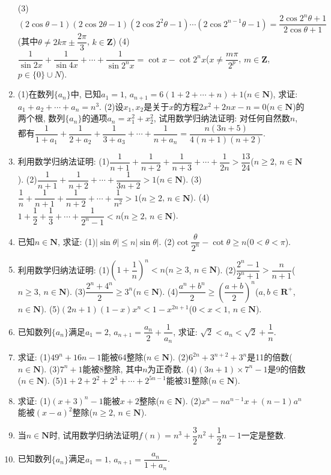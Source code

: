 \documentclass[10pt,a4paper]{article}
\begin{document}
\begin{enumerate}[1.]
(3)$(2\cos \theta -1)(2\cos 2\theta -1)(2\cos 2^2\theta -1)\cdots (2\cos 2^{n-1}\theta -1)=\dfrac{2\cos {2^n}\theta +1}{2\cos \theta +1}$(其中$\theta \ne 2k\pi \pm \dfrac{2\pi }3$, $k\in \mathbf{Z}$)
(4)$\dfrac 1{\sin 2x}+\dfrac 1{\sin 4x}+\cdots +\dfrac 1{\sin 2^nx}=\cot x-\cot 2^nx$($x\ne \dfrac{m\pi }{2^p}$, $m\in \mathbf{Z}$, $p\in \{0\}\cup N$).
\item (1)在数列$\{a_n\}$中, 已知$a_1=1$, $a_{n+1}=6(1+2+\cdots +n)+1$($n\in \mathbf{N}$), 求证: $a_1+a_2+\cdots +a_n=n^3$.
(2)设$x_1,x_2$是关于$x$的方程$2x^2+2nx-n=0$($n\in \mathbf{N}$)的两个根, 数列$\{a_n\}$的通项$a_n=x_1^2+x_2^2$, 试用数学归纳法证明: 对任何自然数$n$, 都有$\dfrac 1{1+a_1}+\dfrac 1{2+a_2}+\dfrac 1{3+a_3}+\cdots +\dfrac 1{n+a_n}=\dfrac{n(3n+5)}{4(n+1)(n+2)}$.
\item 利用数学归纳法证明:
(1)$\dfrac 1{n+1}+\dfrac 1{n+2}+\dfrac 1{n+3}+\cdots +\dfrac 1{2n}>\dfrac{13}{24}$($n\ge 2$, $n\in \mathbf{N}$).
(2)$\dfrac 1{n+1}+\dfrac 1{n+2}+\cdots +\dfrac 1{3n+2}>1$($n\in \mathbf{N}$).
(3)$\dfrac 1n+\dfrac 1{n+1}+\dfrac 1{n+2}+\cdots +\dfrac 1{n^2}>1$($n\ge 2$, $n\in \mathbf{N}$).
(4)$1+\dfrac 12+\dfrac 13+\cdots +\dfrac 1{2^n-1}<n$($n\ge 2$, $n\in \mathbf{N}$).
\item 已知$n\in \mathbf{N}$, 求证:
(1)$|\sin \theta|\le n|\sin \theta|$.
(2)$\cot \dfrac{\theta }{2^n}-\cot \theta \ge n$($0<\theta <\pi$).
\item 利用数学归纳法证明:
(1)$(1+\dfrac 1n)^n<n$($n\ge 3$, $n\in \mathbf{N}$).
(2)$\dfrac{{2^n}-1}{{2^n}+1}>\dfrac n{n+1}$($n\ge 3$, $n\in \mathbf{N}$).
(3)$\dfrac{2^n+4^n}2\ge 3^n$($n\in \mathbf{N}$).
(4)$\dfrac{a^n+b^n}2\ge (\dfrac{a+b}2)^n$($a,b\in \mathbf{R}^+$, $n\in \mathbf{N}$).
(5)$(2n+1)(1-x)x^n<1-x^{2n+1}$($0<x<1$, $n\in \mathbf{N}$).
\item 已知数列$\{a_n\}$满足$a_1=2$, $a_{n+1}=\dfrac{a_n}2+\dfrac 1{a_n}$, 求证: $\sqrt 2<a_n<\sqrt 2+\dfrac 1n$.
\item 求证:
(1)$49^n+16n-1$能被64整除($n\in \mathbf{N}$).
(2)$6^{2n}+3^{n+2}+3^n$是11的倍数($n\in \mathbf{N}$).
(3)$7^n+1$能被8整除, 其中$n$为正奇数.
(4)$(3n+1)\times 7^n-1$是9的倍数($n\in \mathbf{N}$).
(5)$1+2+2^2+2^3+\cdots +2^{5n-1}$能被31整除($n\in \mathbf{N}$).
\item 求证:
(1)$(x+3)^n-1$能被$x+2$整除($n\in \mathbf{N}$).
(2)$x^n-na^{n-1}x+(n-1)a^n$能被$(x-a)^2$整除($n\ge 2$, $n\in \mathbf{N}$).
\item 当$n\in \mathbf{N}$时, 试用数学归纳法证明$f(n)=n^3+\dfrac 32n^2+\dfrac 12n-1$一定是整数.
\item 已知数列$\{a_n\}$满足$a_1=1$, $a_{n+1}=\dfrac{a_n}{1+{a_n}}$.

\end{enumerate}
\end{document}
